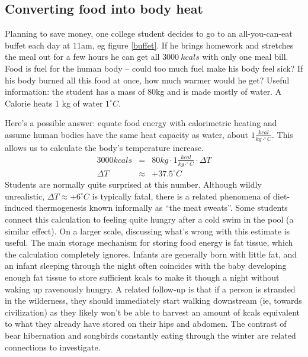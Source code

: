 \documentclass[12pt]{iopart}
\newcommand{\bea}{\begin{eqnarray}}
\newcommand{\eea}{\end{eqnarray}}
\newcommand{\degC}{^{\circ}C}
\begin{document}
\subsection{Converting food into body heat}
Planning to save money, one college student decides to go to an all-you-can-eat buffet each day at 11am, eg figure \ref{buffet}.  If he brings homework and stretches the meal out for a few hours he can get all $3000~kcals$ with only one meal bill.  Food is fuel for the human body -- could too much fuel make his body feel sick? If his body burned all this food at once, how much warmer would he get? 
Useful information: the student has a mass of 80kg and is made mostly of water.  A Calorie heats 1 kg of water $1^{\circ}C$. 

Here's a possible answer:
equate food energy with calorimetric heating and assume human bodies have the same heat capacity as water, about $1\frac{kcal}{kg\cdot\degC}$. This allows us to calculate the body's temperature increase.
\bea
3000kcals &=& 80kg\cdot1 \frac{kcal}{kg\cdot \degC}\cdot\Delta T\\
\Delta T &\approx& +37.5\degC
\eea
Students are normally quite surprised at this number.  Although wildly unrealistic, $\Delta T \approx +6\degC$ is typically fatal, there is a related phenomena of diet-induced thermogenesis\cite{meat_sweats} known informally as ``the meat sweats''. Some students connect this calculation to feeling quite hungry after a cold swim in the pool (a similar effect).  On a larger scale, discussing what's wrong with this estimate is useful.  The main storage mechanism for storing food energy is fat tissue, which the calculation completely ignores.  Infants are generally born with little fat, and an infant sleeping through the night often coincides with the baby developing enough fat tissue to store sufficient kcals to make it though a night without waking up ravenously hungry.  A related follow-up is that if a person is stranded in the wilderness, they should immediately start walking downstream (ie, towards civilization) as they likely won't be able to harvest an amount of kcals equivalent to what they already have stored on their hips and abdomen.\cite{trout}  The contrast of bear hibernation \cite{fat_bear} and songbirds constantly eating through the winter are related connections to investigate.
\end{document}
